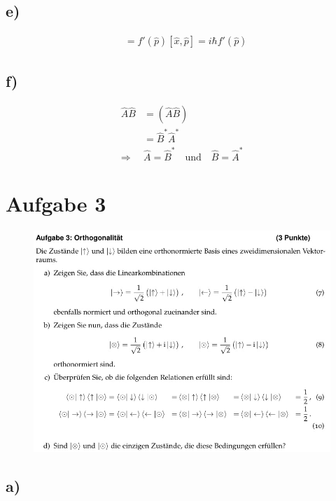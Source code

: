     \subsection{e)}
    \begin{align}
    [\hat x , f(\hat p)] &= f' (\hat p ) [\hat x , \hat p] = i \hbar f' (\hat p)
    \end{align}
    \subsection{f)}
    \begin{align}
    \hat A \hat B &= (\hat A \hat B)\\
    &= \hat B ^* \hat A ^*\\
    \Rightarrow & \hat A = \hat B ^* \quad \text{und} \quad \hat B = \hat A ^* 
    \end{align}


\section{Aufgabe 3}

    \begin{figure}[H]
        \centering
        \includegraphics[width=\textwidth]{images/Aufgabe3.jpg}
        \label{fig:4}
    \end{figure}

    \subsection{a)}

